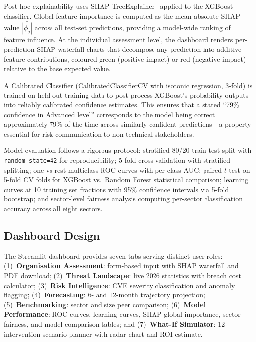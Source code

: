 \documentclass[journal]{IEEEtran}
\begin{document}
Post-hoc explainability uses SHAP TreeExplainer~\cite{lundberg2017shap}
applied to the XGBoost classifier. Global feature importance is computed as
the mean absolute SHAP value $\bar{|\phi_j|}$ across all test-set predictions,
providing a model-wide ranking of feature influence. At the individual
assessment level, the dashboard renders per-prediction SHAP waterfall charts
that decompose any prediction into additive feature contributions, coloured
green (positive impact) or red (negative impact) relative to the base
expected value.

A Calibrated Classifier (CalibratedClassifierCV with isotonic regression,
3-fold) is trained on held-out training data to post-process XGBoost's
probability outputs into reliably calibrated confidence estimates. This
ensures that a stated ``79\% confidence in Advanced level'' corresponds to
the model being correct approximately 79\% of the time across similarly
confident predictions---a property essential for risk communication to
non-technical stakeholders.

Model evaluation follows a rigorous protocol: stratified 80/20 train-test
split with \texttt{random\_state=42} for reproducibility; 5-fold
cross-validation with stratified splitting; one-vs-rest multiclass ROC curves
with per-class AUC; paired $t$-test on 5-fold CV folds for XGBoost vs.\
Random Forest statistical comparison; learning curves at 10 training set
fractions with 95\% confidence intervals via 5-fold bootstrap; and
sector-level fairness analysis computing per-sector classification accuracy
across all eight sectors.

\subsection{Dashboard Design}

The Streamlit dashboard provides seven tabs serving distinct user roles:
(1)~\textbf{Organisation Assessment}: form-based input with SHAP waterfall
and PDF download; (2)~\textbf{Threat Landscape}: live 2026 statistics with
breach cost calculator; (3)~\textbf{Risk Intelligence}: CVE severity
classification and anomaly flagging; (4)~\textbf{Forecasting}: 6- and
12-month trajectory projection; (5)~\textbf{Benchmarking}: sector and size
peer comparison; (6)~\textbf{Model Performance}: ROC curves, learning
curves, SHAP global importance, sector fairness, and model comparison
tables; and (7)~\textbf{What-If Simulator}: 12-intervention scenario
planner with radar chart and ROI estimate.
\end{document}
